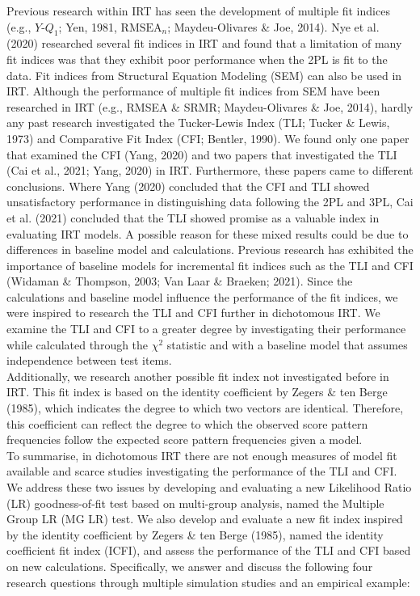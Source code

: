 \documentclass[Royal,sageapa,times,doublespace]{sagej}
\begin{document}
\indent Previous research within IRT has seen the development of multiple fit indices (e.g., $Y\text{-}Q_1$; Yen, 1981, $\text{RMSEA}_n$; Maydeu-Olivares \& Joe, 2014). Nye et al. (2020) researched several fit indices in IRT and found that a limitation of many fit indices was that they exhibit poor performance when the 2PL is fit to the data. Fit indices from Structural Equation Modeling (SEM) can also be used in IRT. Although the performance of multiple fit indices from SEM have been researched in IRT (e.g., RMSEA \& SRMR; Maydeu-Olivares \& Joe, 2014), hardly any past research investigated the Tucker-Lewis Index (TLI; Tucker \& Lewis, 1973) and Comparative Fit Index (CFI; Bentler, 1990). We found only one paper that examined the CFI (Yang, 2020) and two papers that investigated the TLI (Cai et al., 2021; Yang, 2020) in IRT. Furthermore, these papers came to different conclusions. Where Yang (2020) concluded that the CFI and TLI showed unsatisfactory performance in distinguishing data following the 2PL and 3PL, Cai et al. (2021) concluded that the TLI showed promise as a valuable index in evaluating IRT models. A possible reason for these mixed results could be due to differences in baseline model and calculations. Previous research has exhibited the importance of baseline models for incremental fit indices such as the TLI and CFI (Widaman \& Thompson, 2003; Van Laar \& Braeken; 2021). Since the calculations and baseline model influence the performance of the fit indices, we were inspired to research the TLI and CFI further in dichotomous IRT. We examine the TLI and CFI to a greater degree by investigating their performance while calculated through the $\chi^2$ statistic and with a baseline model that assumes independence between test items. \\
\indent Additionally, we research another possible fit index not investigated before in IRT. This fit index is based on the identity coefficient by Zegers \& ten Berge (1985), which indicates the degree to which two vectors are identical. Therefore, this coefficient can reflect the degree to which the observed score pattern frequencies follow the expected score pattern frequencies given a model. \\
\indent To summarise, in dichotomous IRT there are not enough measures of model fit available and scarce studies investigating the performance of the TLI and CFI. We address these two issues by developing and evaluating a new Likelihood Ratio (LR) goodness-of-fit test based on multi-group analysis, named the Multiple Group LR (MG LR) test. We also develop and evaluate a new fit index inspired by the identity coefficient by Zegers \& ten Berge (1985), named the identity coefficient fit index (ICFI), and assess the performance of the TLI and CFI based on new calculations. Specifically, we answer and discuss the following four research questions through multiple simulation studies and an empirical example:
\end{document}
